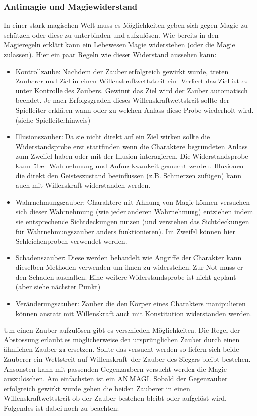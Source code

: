 \documentclass{article}
\begin{document}
\subsubsection{Antimagie und Magiewiderstand}

In einer stark magischen Welt muss es Möglichkeiten geben sich gegen Magie zu schützen oder diese zu unterbinden und
aufzulösen. Wie bereits in den Magieregeln erklärt kann ein Lebewesen Magie widerstehen (oder die Magie zulassen).
Hier ein paar Regeln wie dieser Widerstand aussehen kann:

\begin{itemize}
\item Kontrollzaube: Nachdem der Zauber erfolgreich gewirkt wurde, treten Zauberer und Ziel in einen Willenskraftwettstreit ein. Verliert das Ziel ist es unter Kontrolle des Zaubers. Gewinnt das Ziel wird der Zauber automatisch beendet. Je nach Erfolgsgraden dieses Willenskraftwettstreit sollte der Spielleiter erklären wann oder zu welchen Anlass diese Probe wiederholt wird. (siehe Spielleiterhinweis)
\item Illusionszauber: Da sie nicht direkt auf ein Ziel wirken sollte die Widerstandsprobe erst stattfinden wenn die Charaktere begründeten Anlass zum Zweifel haben oder mit der Illusion interagieren. Die Widerstandsprobe kann über Wahrnehmung und Aufmerksamkeit gemacht werden. Illusionen die direkt den Geisteszustand beeinflussen (z.B. Schmerzen zufügen) kann auch mit Willenskraft widerstanden werden.
\item Wahrnehmungszauber: Charaktere mit Ahnung von Magie können versuchen sich dieser Wahrnehmung (wie jeder anderen Wahrnehmung) entziehen indem sie entsprechende Sichtdeckungen nutzen (und verstehen das Sichtdeckungen für Wahrnehmungszauber anders funktionieren). Im Zweifel können hier Schleichenproben verwendet werden.
\item Schadenszauber: Diese werden behandelt wie Angriffe der Charakter kann dieselben Methoden verwenden um ihnen zu widerstehen. Zur Not muss er den Schaden aushalten. Eine weitere Widerstandsprobe ist nicht geplant (aber siehe nächster Punkt)
\item Veränderungszauber: Zauber die den Körper eines Charakters manipulieren können anstatt mit Willenskraft auch mit Konstitution widerstanden werden.
\end{itemize}

Um einen Zauber aufzulösen gibt es verschieden Möglichkeiten. Die Regel der Abstossung erlaubt es möglicherweise den
ursprünglichen Zauber durch einen ähnlichen Zauber zu ersetzen. Sollte das versucht werden so liefern sich beide
Zauberer ein Wettstreit auf Willenskraft, der Zauber des Siegers bleibt bestehen. Ansonsten kann mit passenden
Gegenzaubern versucht werden die Magie auszulöschen. Am einfachsten ist ein AN MAGI. Sobald der Gegenzauber
erfolgreich gewirkt wurde gehen die beiden Zauberer in einen Willenskraftwettstreit ob der Zauber bestehen bleibt
oder aufgelöst wird. Folgendes ist dabei noch zu beachten:
\end{document}
